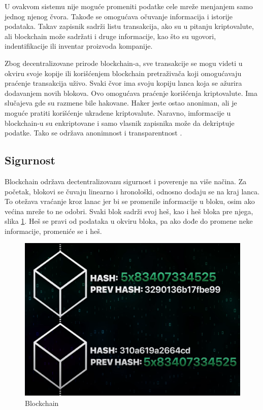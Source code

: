 \documentclass[a4paper]{article}
\begin{document}
{\newpage

U ovakvom sistemu nije moguće promeniti podatke cele mreže menjanjem samo jednog njenog čvora. Takođe se omogućava očuvanje informacija i istorije podataka. Takav zapisnik sadrži listu transakcija, ako su u pitanju kriptovalute, ali blockchain može sadržati i druge informacije, kao što su ugovori, indentifikacije ili inventar proizvoda kompanije.

Zbog decentralizovane prirode blockchain-a, sve transakcije se mogu videti u okviru svoje kopije ili korišćenjem blockchain pretraživača koji omogućavaju praćenje transakcija uživo. Svaki čvor ima svoju kopiju lanca koja se ažurira dodavanjem novih blokova. Ovo omogućava praćenje korišćenja kriptovalute. Ima slučajeva gde su razmene bile hakovane. Haker jeste ostao anoniman, ali je moguće pratiti korišćenje ukradene kriptovalute. Naravno, imformacije u blockchain-u su enkriptovane i samo vlasnik zapisnika može da dekriptuje podatke. Tako se održava anonimnost i transparentnost \cite{blockchain}.


\subsection{Sigurnost}
\label{subsec:sigurnost}
Blockchain održava dectentralizovanu sigurnost i poverenje na više načina. Za početak, blokovi se čuvaju linearno i hronološki, odnosno dodaju se na kraj lanca. To otežava vraćanje kroz lanac jer bi se promenile informacije u bloku, osim ako većina mreže to ne odobri. Svaki blok sadrži svoj heš, kao i heš bloka pre njega,
slika \ref{fig:blockchain}. Heš se pravi od podataka u okviru bloka, pa ako dođe do promene neke informacije, promeniće se i heš.

\begin{figure}[h!]
\begin{center}
\includegraphics[scale=0.25]{slike/slika2.png}
\end{center}
\caption{Blockchain}
\label{fig:blockchain}
\end{figure}


}
\end{document}

